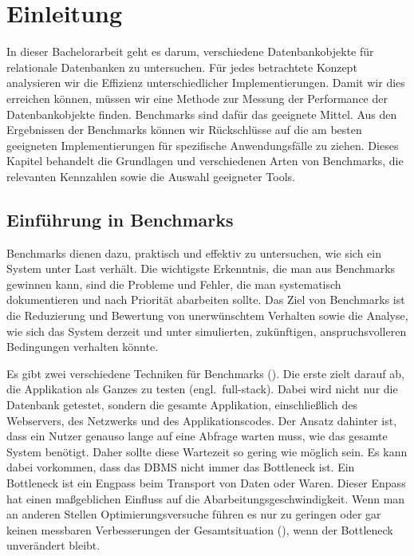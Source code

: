 \chapter{Einleitung}\label{ch:einleitung}

In dieser Bachelorarbeit geht es darum, verschiedene Datenbankobjekte für relationale Datenbanken zu untersuchen.
Für jedes betrachtete Konzept analysieren wir die Effizienz unterschiedlicher Implementierungen.
Damit wir dies erreichen können, müssen wir eine Methode zur Messung der Performance der Datenbankobjekte finden.
Benchmarks sind dafür das geeignete Mittel.
Aus den Ergebnissen der Benchmarks können wir Rückschlüsse  auf die am besten geeigneten Implementierungen für spezifische Anwendungsfälle zu ziehen.
Dieses Kapitel behandelt die Grundlagen und verschiedenen Arten von Benchmarks, die relevanten Kennzahlen sowie die Auswahl geeigneter Tools.

\section{Einführung in Benchmarks}\label{sec:einleitung-einfuehrung}

Benchmarks dienen dazu, praktisch und effektiv zu untersuchen, wie sich ein System unter Last verhält.
Die wichtigste Erkenntnis, die man aus Benchmarks gewinnen kann, sind die Probleme und Fehler, die man systematisch dokumentieren und nach Priorität abarbeiten sollte.
Das Ziel von Benchmarks ist die Reduzierung und Bewertung von unerwünschtem Verhalten sowie die Analyse, wie sich das System derzeit und unter simulierten, zukünftigen, anspruchsvolleren Bedingungen verhalten könnte.

Es gibt zwei verschiedene Techniken für Benchmarks (\cite[pp. 35--49]{schwartz2012high}).
Die erste zielt darauf ab, die Applikation als Ganzes zu testen (engl.\ full-stack).
Dabei wird nicht nur die Datenbank getestet, sondern die gesamte Applikation, einschließlich des Webservers,
des Netzwerks und des Applikationscodes.
Der Ansatz dahinter ist, dass ein Nutzer genauso lange auf eine Abfrage warten muss, wie das gesamte System benötigt.
Daher sollte diese Wartezeit so gering wie möglich sein.
Es kann dabei vorkommen, dass das DBMS nicht immer das Bottleneck ist.
Ein Bottleneck ist ein Engpass beim Transport von Daten oder Waren.
Dieser Enpass hat einen maßgeblichen Einfluss auf die Abarbeitungsgeschwindigkeit.
Wenn man an anderen Stellen Optimierungsversuche führen es nur zu geringen oder gar keinen messbaren Verbesserungen der Gesamtsituation (\cite{bottleneck}), wenn der Bottleneck unverändert bleibt.


